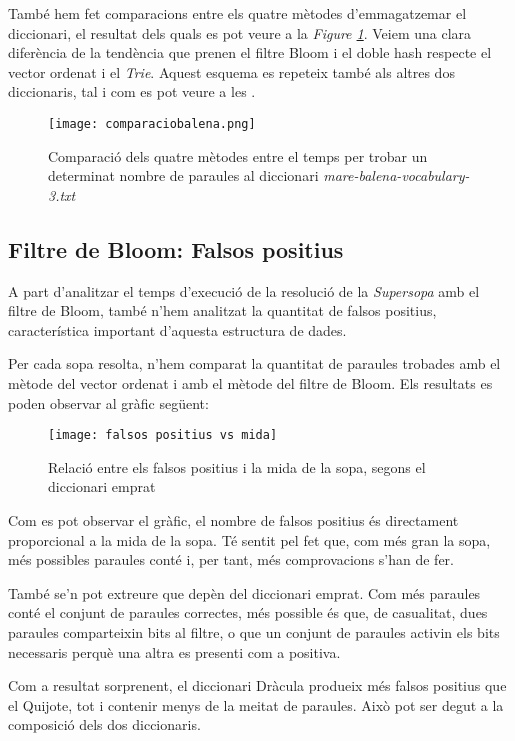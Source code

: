 \documentclass[titlepage]{article}
\begin{document}
També hem fet comparacions entre els quatre mètodes d'emmagatzemar el diccionari, el resultat dels quals es pot veure a la \textit{Figure \ref{fig:compb}}. Veiem una clara diferència de la tendència que prenen el filtre Bloom i el doble hash respecte el vector ordenat i el \textit{Trie}. Aquest esquema es repeteix també als altres dos diccionaris, tal i com es pot veure a les .
\begin{figure}[H]
    \centering
    \texttt{[image: comparaciobalena.png]}
    \caption{Comparació dels quatre mètodes entre el temps per trobar un determinat nombre de paraules al diccionari \textit{mare-balena-vocabulary-3.txt}}
    \label{fig:compb}
\end{figure}



\subsection{Filtre de Bloom: Falsos positius}
A part d'analitzar el temps d'execució de la resolució de la \textit{Supersopa} amb el filtre de Bloom, també n'hem analitzat la quantitat de falsos positius, característica important d'aquesta estructura de dades.
\newline\par
Per cada sopa resolta, n'hem comparat la quantitat de paraules trobades amb el mètode del vector ordenat i amb el mètode del filtre de Bloom. Els resultats es poden observar al gràfic següent:

\begin{figure}[H]
    \centering
    \texttt{[image: falsos positius vs mida]}
    \caption{Relació entre els falsos positius i la mida de la sopa, segons el diccionari emprat}
    \label{fig:my_label}
\end{figure}

Com es pot observar el gràfic, el nombre de falsos positius és directament proporcional a la mida de la sopa. Té sentit pel fet que, com més gran la sopa, més possibles paraules conté i, per tant, més comprovacions s'han de fer.
\newline\par
També se'n pot extreure que depèn del diccionari emprat. Com més paraules conté el conjunt de paraules correctes, més possible és que, de casualitat, dues paraules comparteixin bits al filtre, o que un conjunt de paraules activin els bits necessaris perquè una altra es presenti com a positiva.
\newline\par
Com a resultat sorprenent, el diccionari Dràcula produeix més falsos positius que el Quijote, tot i contenir menys de la meitat de paraules. Això pot ser degut a la composició dels dos diccionaris. 
\end{document}
